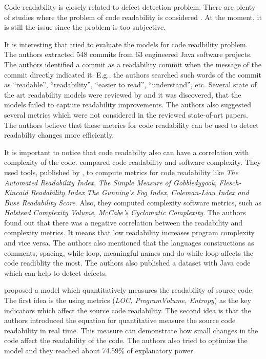 Code readability is closely related to defect detection problem. There are plenty of 
studies where the problem of code readability is considered 
\citep{8651396, xxx66666444, 10.1145/1985441.1985454}. At the moment, it is 
still the issue since the problem is too subjective. 

It is interesting that \citet{10.1109/ICPC.2019.00014} tried to evaluate 
the models for code readbility problem. The authors extracted 548 commits 
from 63 engineered Java software projects. The authors identified a commit as a readability commit
when the message of the commit directly indicated it. E.g., 
the authors searched such words of the commit as ``readable'',
``readability'', ``easier to read'', ``understand'', etc.
Several state of the art readability models were reviewed by \citet{10.1109/ICPC.2019.00014} 
and it was discovered, that the models failed to capture readability improvements. 
The authors also suggested several metrics which were not considered in the reviewed state-of-art papers.
The authors believe that those metrics for code readability can be used to detect readabilty 
changes more efficiently.

It is important to notice that code readabilty also can have a correlation 
with complexity of the code. \citet{10.1109/TSE.2009.70} compared code readability 
and software complexity. They used tools, published by \citet{xxx66666444, Readabil74:online}, to
compute metrics for code readability like \emph{The Automated Readability Index}, 
\emph{The Simple Measure of Gobbledygook}, \emph{Flesch-Kincaid Readability Index}
\emph{The Gunning's Fog Index}, \emph{Coleman-Liau Index and Buse Readability Score}. 
Also, they computed complexity software metrics, such as \emph{Halstead Complexity Volume},
\emph{McCabe's Cyclomatic Complexity}. The authors found out that there was a 
negative correlation between the readability and complexity metrics.
It means that low readability increases program complexity and vice versa. 
The authors also mentioned that the languages constructions as comments, spacing, 
while loop, meaningful names and do-while loop affects the code readiblity the most.
The authors also published a dataset with Java code which can help to detect defects.

\citet{10.1007/978-3-319-95171-3_32} proposed a model which quantitatively measures the readability 
of source code. The first idea is the using metrics (\emph{LOC, ProgramVolume, Entropy})
as the key indicators which affect the source code readability. The second
idea is that the authors introduced the equation for quantitative measure 
the source code readability in real time. This measure can demonstrate 
how small changes in the code affect the readability of the code.
The authors also tried to optimize the model and they reached about 
74.59\% of explanatory power. 
